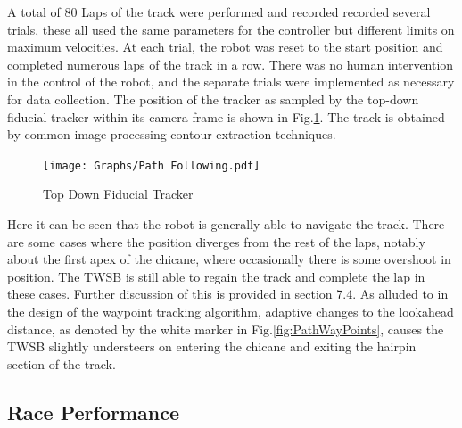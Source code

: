     A total of 80 Laps of the track were performed and recorded recorded several trials, these all used the same parameters for the controller but different limits on maximum velocities. 
    At each trial, the robot was reset to the start position and completed numerous laps of the track in a row. There was no human intervention in the control of the robot,
    and the separate trials were implemented as necessary for data collection.  The position of the tracker as sampled by the top-down fiducial tracker within its camera frame is 
    shown in Fig.\ref{fig:TrajTrack}. The track is obtained by common image processing contour extraction techniques.

    \begin{figure}[H]
        \centering
        \texttt{[image: Graphs/Path Following.pdf]}
        \caption{Top Down Fiducial Tracker}
        \label{fig:TrajTrack}
    \end{figure} 

    Here it can be seen that the robot is generally able to navigate the track. There are some cases where the position diverges from the rest 
    of the laps, notably about the first apex of the chicane, where occasionally there is some overshoot in position. The TWSB is still able to regain the track 
    and complete the lap in these cases. Further discussion of this is provided in section 7.4.
    As alluded to in the design of the waypoint tracking algorithm, adaptive changes to the lookahead distance, as denoted by the white marker in 
    Fig.\ref{fig:PathWayPoints}, causes the TWSB slightly understeers on entering the chicane and exiting the hairpin section of the track. 

    \subsection{Race Performance}

